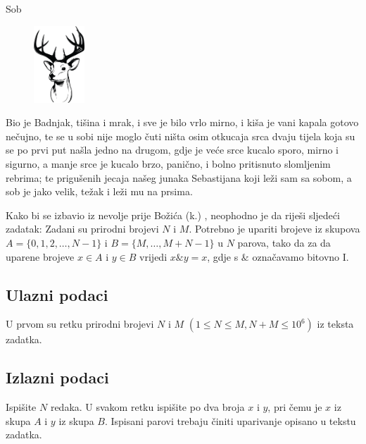 \begin{statement}[
  problempoints=110,
  timelimit=1 sekunda,
  memorylimit=512 MiB,
]{Sob}

\setlength\intextsep{-0.1cm}
\begin{figure}
\centering
\includegraphics[width=0.17\textwidth]{img/sob.png}
\end{figure}

Bio je Badnjak, tišina i mrak, i sve je bilo vrlo mirno, i kiša je vani kapala
gotovo nečujno, te se u sobi nije moglo čuti ništa osim otkucaja srca dvaju
tijela koja su se po prvi put našla jedno na drugom, gdje je veće srce kucalo
sporo, mirno i sigurno, a manje srce je kucalo brzo, panično, i bolno
pritisnuto slomljenim rebrima; te prigušenih jecaja našeg junaka
Sebastijana koji leži sam sa sobom, a sob je jako velik, težak i leži mu na
prsima.

Kako bi se izbavio iz nevolje prije Božića (k.) , neophodno je da riješi
sljedeći zadatak: Zadani su prirodni brojevi $N$ i $M$. Potrebno je upariti
brojeve iz skupova $A = \{ 0, 1, 2, \dots, N - 1 \}$ i $B = \{ M, \dots, M + N - 1
\}$ u $N$ parova, tako da za da uparene brojeve $x \in A$ i $y \in B$ vrijedi
$x \mathbin{\&} y = x$, gdje s $\&$ označavamo bitovno I.

\subsection*{Ulazni podaci}
U prvom su retku prirodni brojevi $N$ i $M$ $(1 \le N \le M, N + M \le 10^6)$
iz teksta zadatka.

\subsection*{Izlazni podaci}
Ispišite $N$ redaka. U svakom retku ispišite po dva broja $x$ i $y$, pri čemu je
$x$ iz skupa $A$ i $y$ iz skupa $B$. Ispisani parovi trebaju činiti uparivanje
opisano u tekstu zadatka.


\end{statement}
